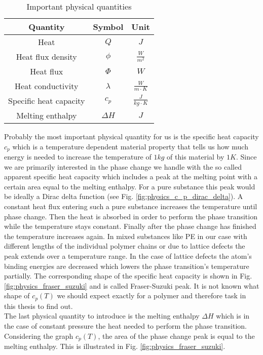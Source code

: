 \documentclass{scrartcl}[12pt, halfparskip]
\numberwithin{equation}{section}
\numberwithin{figure}{section}
\numberwithin{table}{section}
\begin{document}
\begin{table}[H]
	\centering
\begin{tabular}{| c | c | c |} \hline
	Quantity & Symbol & Unit \\ \hline
	Heat & $Q$ & $J$ \\[0.7ex]
	Heat flux density & $\phi$ & $\frac{W}{m^2}$ \\[0.7ex]
	Heat flux & $\varPhi$ & $W$ \\[0.7ex]
	Heat conductivity & $\lambda$ & $\frac{W}{m \cdot K}$ \\[0.7ex]
	Specific heat capacity & $c_p$ & $\frac{J}{kg \cdot K}$ \\[0.7ex]
	Melting enthalpy & $\Delta H$ & $J$ \\ \hline
\end{tabular}
\caption{Important physical quantities}
\label{tab:important_physical_quantities}
\end{table}



Probably the most important physical quantity for us is the specific heat capacity $c_p$ which is a temperature dependent material property that tells us how much energy is needed to increase the temperature of $1kg$ of this material by $1K$. Since we are primarily interested in the phase change we handle with the so called apparent specific heat capacity which includes a peak at the melting point with a certain area equal to the melting enthalpy. For a pure substance this peak would be ideally a Dirac delta function (see Fig. \ref{fig:physics_c_p_dirac_delta}). A constant heat flux entering such a pure substance increases the temperature until phase change. Then the heat is absorbed in order to perform the phase transition while the temperature stays constant. Finally after the phase change has finished the temperature increases again. 
In mixed substances like PE in our case with different lengths of the individual polymer chains or due to lattice defects the peak extends over a temperature range. In the case of lattice defects the atom's binding energies are decreased which lowers the phase transition's temperature partially. The corresponding shape of the specific heat capacity is shown in Fig. \ref{fig:physics_fraser_suzuki} and is called Fraser-Suzuki peak. It is not known what shape of $c_p(T)$ we should expect exactly for a polymer and therefore task in this thesis to find out. \\
The last physical quantity to introduce is the melting enthalpy $\Delta H$ which is in the case of constant pressure the heat needed to perform the phase transition. Considering the graph $c_p(T)$, the area of the phase change peak is equal to the melting enthalpy. This is illustrated in Fig. \ref{fig:physics_fraser_suzuki}.
\end{document}
